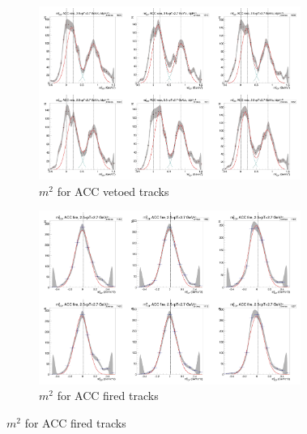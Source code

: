 \begin{figure}[H]
  \ContinuedFloat
    \begin{subfigure}{1\textwidth}
   \centering
   \includegraphics[width=0.94\textwidth]{hiptfits/neg/PSm2_cent0_ich0_accfire0_ptbin10.jpg}
    \caption{$m^2$ for ACC vetoed tracks}
    \end{subfigure}
    \begin{subfigure}{1\textwidth}
   \centering
   \includegraphics[width=0.94\textwidth]{hiptfits/neg/PSm2_cent0_ich0_accfire1_ptbin10.jpg}
    \caption{$m^2$ for ACC fired tracks}
    \end{subfigure}  
\end{figure}
